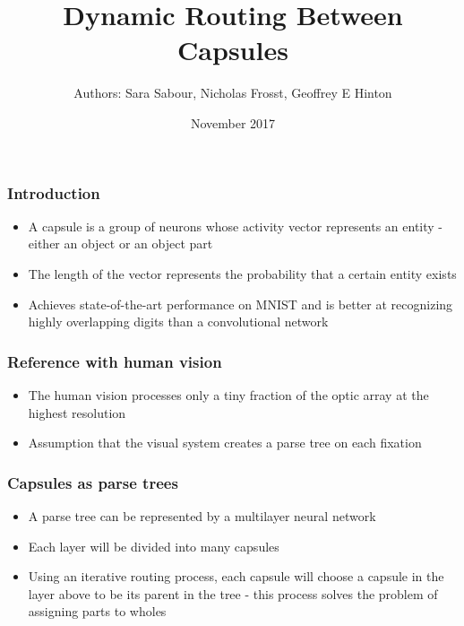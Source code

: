 \documentclass{beamer}
\title[Dynamic Routing Between Capsules]{Dynamic Routing Between Capsules}
\author[Mu\c sat Bogdan-Adrian]{Authors: Sara Sabour, Nicholas Frosst, Geoffrey E Hinton}
\date{November 2017}
\begin{document}
\frame{\titlepage}

\begin{frame}
\frametitle{Introduction}
\center
\begin{itemize}
	\item A capsule is a group of neurons whose activity vector represents an entity - either an object or an object part
	\item The length of the vector represents the probability that a certain entity exists
	\item Achieves state-of-the-art performance on MNIST and is better at recognizing highly overlapping digits than a convolutional network
\end{itemize}
\end{frame}

\begin{frame}
\frametitle{Reference with human vision}
\center
\begin{itemize}
	\item The human vision processes only a tiny fraction of the optic array at the highest resolution
	\item Assumption that the visual system creates a parse tree on each fixation
	\begin{figure}
	\subcapcentertrue
    \centering
    \end{figure}
\end{itemize}
\end{frame}

\begin{frame}
\frametitle{Capsules as parse trees}
\center
\begin{itemize}
	\item A parse tree can be represented by a multilayer neural network
	\item Each layer will be divided into many capsules
	\item Using an iterative routing process, each capsule will choose a capsule in the layer above to be its parent in the tree - this process solves the problem of assigning parts to wholes
\end{itemize}
\end{frame}
\end{document}
